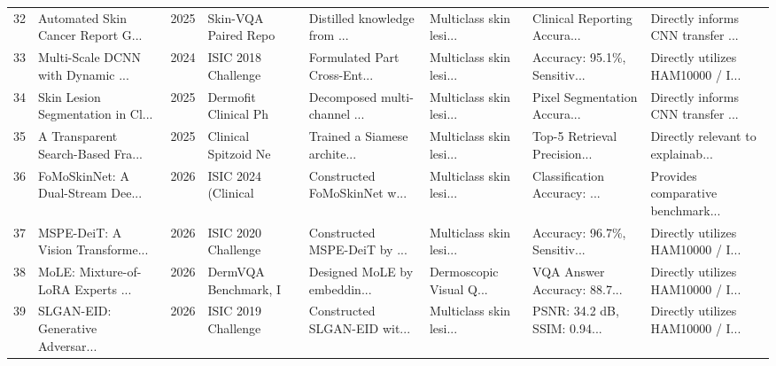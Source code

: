 \documentclass[11pt,a4paper]{article}
\begin{document}
\begin{small}
\begin{longtable}{p{0.5cm} p{2.2cm} p{0.8cm} p{1.8cm} p{2.0cm} p{2.0cm} p{2.0cm} p{2.5cm}}
32 & Automated Skin Cancer Report G... & 2025 & Skin-VQA Paired Repo & Distilled knowledge from ... & Multiclass skin lesi... & Clinical Reporting Accura... & Directly informs CNN transfer ... \\
33 & Multi-Scale DCNN with Dynamic ... & 2024 & ISIC 2018 Challenge  & Formulated Part Cross-Ent... & Multiclass skin lesi... & Accuracy: 95.1\%, Sensitiv... & Directly utilizes HAM10000 / I... \\
34 & Skin Lesion Segmentation in Cl... & 2025 & Dermofit Clinical Ph & Decomposed multi-channel ... & Multiclass skin lesi... & Pixel Segmentation Accura... & Directly informs CNN transfer ... \\
35 & A Transparent Search-Based Fra... & 2025 & Clinical Spitzoid Ne & Trained a Siamese archite... & Multiclass skin lesi... & Top-5 Retrieval Precision... & Directly relevant to explainab... \\
36 & FoMoSkinNet: A Dual-Stream Dee... & 2026 & ISIC 2024 (Clinical  & Constructed FoMoSkinNet w... & Multiclass skin lesi... & Classification Accuracy: ... & Provides comparative benchmark... \\
37 & MSPE-DeiT: A Vision Transforme... & 2026 & ISIC 2020 Challenge  & Constructed MSPE-DeiT by ... & Multiclass skin lesi... & Accuracy: 96.7\%, Sensitiv... & Directly utilizes HAM10000 / I... \\
38 & MoLE: Mixture-of-LoRA Experts ... & 2026 & DermVQA Benchmark, I & Designed MoLE by embeddin... & Dermoscopic Visual Q... & VQA Answer Accuracy: 88.7... & Directly utilizes HAM10000 / I... \\
39 & SLGAN-EID: Generative Adversar... & 2026 & ISIC 2019 Challenge  & Constructed SLGAN-EID wit... & Multiclass skin lesi... & PSNR: 34.2 dB, SSIM: 0.94... & Directly utilizes HAM10000 / I... \\

\end{longtable}
\end{small}

\newpage
\end{document}

